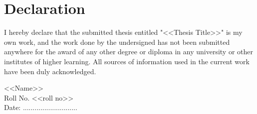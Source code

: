 
\chapter*{Declaration}
\thispagestyle{empty}


\vspace{1cm}
\nohyphens{I hereby declare that the submitted thesis entitled "<<Thesis Title>>" is my own work, and the work done by the undersigned has not been submitted anywhere for the award of any other degree or diploma in any university or other institutes of higher learning. All sources of information used in the current work have been duly acknowledged.
}


\vspace*{3cm}
\begin{flushright}
    
	<<Name>>	\\
	\vspace*{0.2cm}
        Roll No. <<roll no>>\\
	 Date: ............................

\end{flushright}

